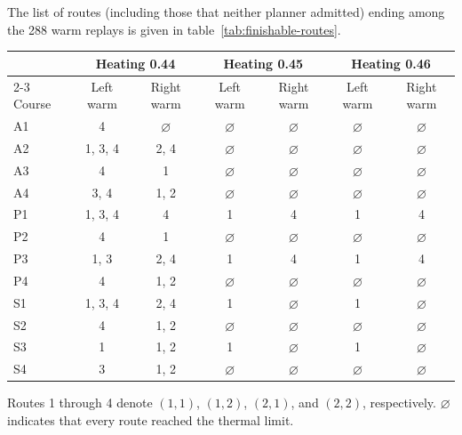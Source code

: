 \documentclass{ieeeaccess}
\makeatletter
\newenvironment{appendixdisplay}[1]
  {\par\addvspace{4pt}\noindent\begin{minipage}{\linewidth}\def\@captype{#1}}
  {\end{minipage}\par\addvspace{6pt}}
\makeatother
\begin{document}
\begin{appendixdisplay}{table}
The list of routes (including those that neither planner admitted) ending among the 288 warm replays is given in table~\ref{tab:finishable-routes}.\par
\caption{Finishable routes for both assignments at every setting}
\label{tab:finishable-routes}
\centering
\footnotesize
\setlength{\tabcolsep}{4pt}
\renewcommand{\arraystretch}{1.00}
\begin{tabular*}{\linewidth}{@{\extracolsep{\fill}}lcccccc@{}}
\hline
& \multicolumn{2}{c}{Heating 0.44} & \multicolumn{2}{c}{Heating 0.45} & \multicolumn{2}{c}{Heating 0.46} \\
\cline{2-3}\cline{4-5}\cline{6-7}
Course & Left warm & Right warm & Left warm & Right warm & Left warm & Right warm \\
\hline
A1 & 4 & $\varnothing$ & $\varnothing$ & $\varnothing$ & $\varnothing$ & $\varnothing$ \\
A2 & 1, 3, 4 & 2, 4 & $\varnothing$ & $\varnothing$ & $\varnothing$ & $\varnothing$ \\
A3 & 4 & 1 & $\varnothing$ & $\varnothing$ & $\varnothing$ & $\varnothing$ \\
A4 & 3, 4 & 1, 2 & $\varnothing$ & $\varnothing$ & $\varnothing$ & $\varnothing$ \\
P1 & 1, 3, 4 & 4 & 1 & 4 & 1 & 4 \\
P2 & 4 & 1 & $\varnothing$ & $\varnothing$ & $\varnothing$ & $\varnothing$ \\
P3 & 1, 3 & 2, 4 & 1 & 4 & 1 & 4 \\
P4 & 4 & 1, 2 & $\varnothing$ & $\varnothing$ & $\varnothing$ & $\varnothing$ \\
S1 & 1, 3, 4 & 2, 4 & 1 & $\varnothing$ & 1 & $\varnothing$ \\
S2 & 4 & 1, 2 & $\varnothing$ & $\varnothing$ & $\varnothing$ & $\varnothing$ \\
S3 & 1 & 1, 2 & 1 & $\varnothing$ & 1 & $\varnothing$ \\
S4 & 3 & 1, 2 & $\varnothing$ & $\varnothing$ & $\varnothing$ & $\varnothing$ \\
\hline
\end{tabular*}
\par\smallskip
\parbox{\linewidth}{\raggedright Routes 1 through 4 denote $(1,1)$, $(1,2)$, $(2,1)$, and $(2,2)$, respectively. $\varnothing$ indicates that every route reached the thermal limit.}
\end{appendixdisplay}
\end{document}

